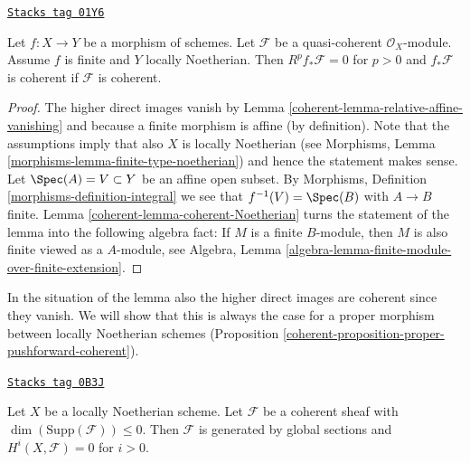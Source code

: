 \begin{lemma}
\label{coherent-lemma-finite-pushforward-coherent}
\href{https://stacks.math.columbia.edu/tag/01Y6}{\texttt{Stacks tag 01Y6}}

Let $f : X \to Y$ be a morphism of schemes.
Let $\mathcal{F}$ be a quasi-coherent $\mathcal{O}_X$-module.
Assume $f$ is finite and $Y$ locally Noetherian.
Then $R^pf_*\mathcal{F} = 0$ for $p > 0$ and
$f_*\mathcal{F}$ is coherent if $\mathcal{F}$ is coherent.
\end{lemma}

\begin{proof}

The higher direct images vanish by
Lemma \ref{coherent-lemma-relative-affine-vanishing} and because
a finite morphism is affine (by definition).
Note that the assumptions imply that also $X$ is locally Noetherian
(see Morphisms, Lemma \ref{morphisms-lemma-finite-type-noetherian})
and hence the statement makes sense.
Let $\Spec(A) = V \subset Y$ be an affine open subset.
By Morphisms, Definition \ref{morphisms-definition-integral}
we see that $f^{-1}(V) = \Spec(B)$ with $A \to B$ finite.
Lemma \ref{coherent-lemma-coherent-Noetherian}
turns the statement of the lemma into the following algebra
fact: If $M$ is a finite $B$-module, then $M$ is also finite
viewed as a $A$-module, see
Algebra, Lemma \ref{algebra-lemma-finite-module-over-finite-extension}.
\end{proof}

In the situation of the lemma also the higher direct images are
coherent since they vanish.
We will show that this is always the case for a proper morphism
between locally Noetherian schemes
(Proposition \ref{coherent-proposition-proper-pushforward-coherent}).

\begin{lemma}
\label{coherent-lemma-coherent-support-dimension-0}
\href{https://stacks.math.columbia.edu/tag/0B3J}{\texttt{Stacks tag 0B3J}}

Let $X$ be a locally Noetherian scheme. Let $\mathcal{F}$
be a coherent sheaf with $\dim(\text{Supp}(\mathcal{F})) \leq 0$.
Then $\mathcal{F}$ is generated by global sections and
$H^i(X, \mathcal{F}) = 0$ for $i > 0$.
\end{lemma}


